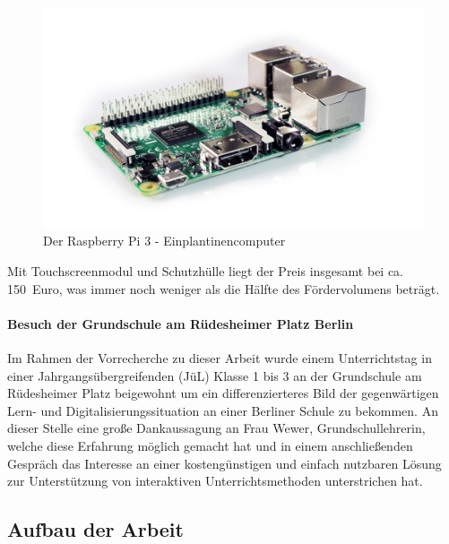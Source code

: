 \begin{figure}[H]
	\centering
	\includegraphics[width=0.9\linewidth]{bilder/raspberry-pi}
	\caption[Raspberry Pi 3 - Einplantinencomputer]{Der Raspberry Pi 3 - Einplantinencomputer \cite{PixaPi2016}}
	\label{fig:raspberrypi}
\end{figure}

Mit Touchscreenmodul und Schutzhülle liegt der Preis insgesamt bei ca. 150~Euro, was immer noch weniger als die Hälfte des Fördervolumens beträgt.



\paragraph{Besuch der Grundschule am Rüdesheimer Platz Berlin}\label{sec:grundschulebesuch}
Im Rahmen der Vorrecherche zu dieser Arbeit wurde einem Unterrichtstag in 
einer Jahrgangsübergreifenden (JüL) Klasse 1 bis 3 an der Grundschule am Rüdesheimer Platz beigewohnt um ein differenzierteres 
Bild der gegenwärtigen Lern- und Digitalisierungssituation an einer Berliner Schule zu bekommen. An dieser Stelle eine große Dankaussagung an Frau Wewer, Grundschullehrerin, welche diese Erfahrung möglich gemacht hat und in einem anschließenden Gespräch das Interesse an einer kostengünstigen und einfach nutzbaren Lösung zur Unterstützung von interaktiven Unterrichtsmethoden unterstrichen hat.
\newpage
\subsection{Aufbau der Arbeit}


